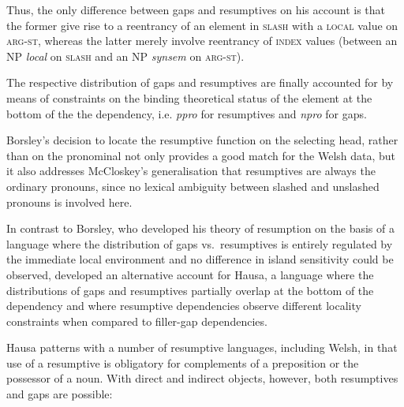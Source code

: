 \documentclass[output=paper
                ,modfonts
                ,nonflat
	        ,collection
	        ,collectionchapter
	        ,collectiontoclongg
 	        ,biblatex
                ,babelshorthands
                ,newtxmath
                ,draftmode
                ,colorlinks, citecolor=brown
]{./langsci/langscibook}
\begin{document}
{%
\noindent
Thus, the only difference between gaps and resumptives on his account
is that the former give rise to a reentrancy of an element in
\textsc{slash} with a \textsc{local} value on \textsc{arg-st}, whereas the latter merely involve reentrancy of \textsc{index} values (between an NP \textit{local}  on \textsc{slash} and an NP \textit{synsem} on \textsc{arg-st}).  

The respective distribution of gaps and resumptives are finally
accounted for by means of constraints on the binding theoretical
status of the element at the bottom of the the dependency,
i.e. \textit{ppro} for resumptives and \textit{npro} for gaps.

Borsley's decision to locate the resumptive function on the selecting head, rather than on the pronominal not only provides a good match for the Welsh data, but it also addresses McCloskey's generalisation \citep{mccloskey02:_resum_succes_cyclic_local_operat} that resumptives are always the ordinary pronouns, since no lexical ambiguity between slashed and unslashed pronouns is involved here.  

In contrast to Borsley, who developed his theory of resumption on the
basis of a language where the distribution of gaps vs.\ resumptives is
entirely regulated by the immediate local environment and no difference in island sensitivity could be observed, \citet{Crysmann:12} developed an alternative account for Hausa, a language where the distributions of gaps and resumptives partially overlap at the bottom of the dependency and where resumptive dependencies observe different locality constraints when compared to filler-gap dependencies. 

Hausa patterns with a number of resumptive languages, including Welsh, in that use of a resumptive is obligatory for complements of a preposition or the possessor of a noun. With direct and indirect objects, however, both resumptives and gaps are possible: 

}
\end{document}
